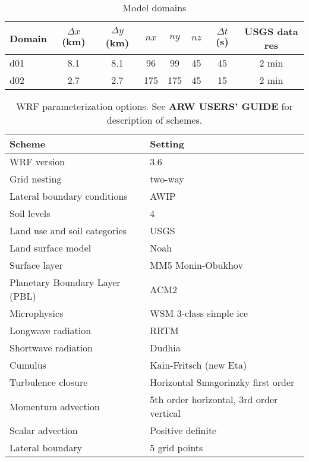 \documentclass[12pt]{amsart}
\begin{document}
\begin{table}
\begin{tabular}{ l c c c c c c c }
\hline
Domain & $\Delta x$ (km) & $\Delta y$ (km) & $nx$ & $ny$ & $nz$ & $\Delta t$ (s) & USGS data res \\ \hline
d01 & 8.1 & 8.1 & 96 & 99 & 45 & 45 & 2 min\\
d02 & 2.7 & 2.7 & 175 & 175 & 45 & 15 & 2 min\\
\hline
\end{tabular}
\caption{Model domains}
\label{table:windSol_domains}
\end{table}

\begin{table}
\begin{tabular}{l l}
\hline
Scheme & Setting \\ \hline
WRF version & 3.6 \\
Grid nesting & two-way \\
Lateral boundary conditions & AWIP \\
Soil levels & 4 \\
Land use and soil categories & USGS \\
Land surface model & Noah \\
Surface layer & MM5 Monin-Obukhov \\
Planetary Boundary Layer (PBL) & ACM2 \\
Microphysics & WSM 3-class simple ice \\
Longwave radiation & RRTM \\
Shortwave radiation & Dudhia \\
Cumulus & Kain-Fritsch (new Eta) \\
Turbulence closure & Horizontal Smagorinzky first order \\
Momentum advection & 5th order horizontal, 3rd order vertical \\
Scalar advection & Positive definite \\
Lateral boundary & 5 grid points \\
\hline
\end{tabular}
\caption{WRF parameterization options.  See \textbf{ARW USERS' GUIDE} for description of schemes.}
\label{table:windSol_paramschemes}
\end{table}
\end{document}
